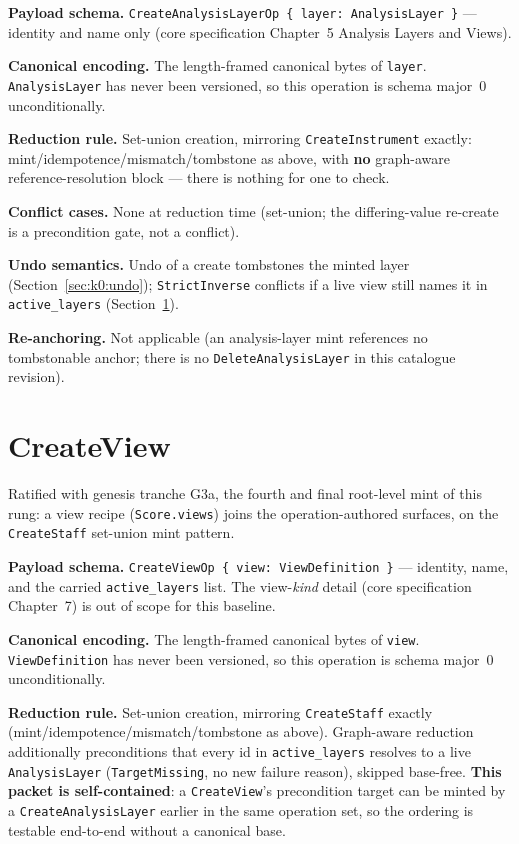 \documentclass[11pt,letterpaper]{report}
\newcommand{\sectionsc}[1]{{\addfontfeatures{Letters=SmallCaps}#1}}
\begin{document}
\textbf{Payload schema.} \texttt{CreateAnalysisLayerOp \{ layer:
AnalysisLayer \}} --- identity and name only (core specification Chapter~5
\sectionsc{Analysis Layers and Views}).

\textbf{Canonical encoding.} The length-framed canonical bytes of
\texttt{layer}. \texttt{AnalysisLayer} has never been versioned, so this
operation is schema major~0 unconditionally.

\textbf{Reduction rule.} Set-union creation, mirroring \texttt{CreateInstrument}
exactly: mint/idempotence/mismatch/tombstone as above, with \textbf{no}
graph-aware reference-resolution block --- there is nothing for one to check.

\textbf{Conflict cases.} None at reduction time (set-union; the differing-value
re-create is a precondition gate, not a conflict).

\textbf{Undo semantics.} Undo of a create tombstones the minted layer
(Section~\ref{sec:k0:undo}); \texttt{StrictInverse} conflicts if a live view
still names it in \texttt{active\_layers} (Section~\ref{sec:k0:create-view}).

\textbf{Re-anchoring.} Not applicable (an analysis-layer mint references no
tombstonable anchor; there is no \texttt{DeleteAnalysisLayer} in this
catalogue revision).

\section{CreateView}
\label{sec:k0:create-view}

Ratified with genesis tranche G3a, the fourth and final root-level mint of
this rung: a view recipe (\texttt{Score.views}) joins the operation-authored
surfaces, on the \texttt{CreateStaff} set-union mint pattern.

\textbf{Payload schema.} \texttt{CreateViewOp \{ view: ViewDefinition \}} ---
identity, name, and the carried \texttt{active\_layers} list. The
view-\emph{kind} detail (core specification Chapter~7) is out of scope for
this baseline.

\textbf{Canonical encoding.} The length-framed canonical bytes of
\texttt{view}. \texttt{ViewDefinition} has never been versioned, so this
operation is schema major~0 unconditionally.

\textbf{Reduction rule.} Set-union creation, mirroring \texttt{CreateStaff}
exactly (mint/idempotence/mismatch/tombstone as above). Graph-aware reduction
additionally preconditions that every id in \texttt{active\_layers} resolves
to a live \texttt{AnalysisLayer} (\texttt{TargetMissing}, no new failure
reason), skipped base-free. \textbf{This packet is self-contained}: a
\texttt{CreateView}'s precondition target can be minted by a
\texttt{CreateAnalysisLayer} earlier in the same operation set, so the
ordering is testable end-to-end without a canonical base.
\end{document}
